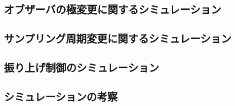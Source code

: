 \subsection{オブザーバの極変更に関するシミュレーション}

\subsection{サンプリング周期変更に関するシミュレーション}

\subsection{振り上げ制御のシミュレーション}

\subsection{シミュレーションの考察}

